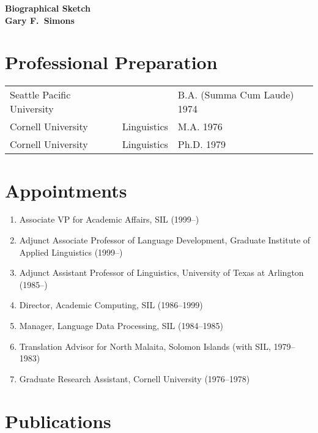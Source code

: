 \documentclass[11pt]{article}
\begin{document}
\begin{center}
{\large\bf Biographical Sketch\\[15pt] Gary F.~Simons}
\end{center}

\section{Professional Preparation}

\begin{tabular}{lll}
Seattle Pacific University & & B.A. (Summa Cum Laude) 1974 \\
Cornell University & Linguistics & M.A. 1976 \\
Cornell University & Linguistics & Ph.D. 1979 \\
\end{tabular}

\section{Appointments}

\begin{enumerate}
\item Associate VP for Academic Affairs, SIL (1999--)

\item Adjunct Associate Professor of Language Development,
  Graduate Institute of Applied Linguistics (1999--)

\item Adjunct Assistant Professor of Linguistics,
  University of Texas at Arlington (1985--)

\item Director, Academic Computing, SIL (1986--1999)

\item Manager, Language Data Processing, SIL (1984--1985)

\item Translation Advisor for North Malaita, Solomon Islands (with SIL, 1979--1983)

\item Graduate Research Assistant, Cornell University (1976--1978)

\end{enumerate}

\section{Publications}
\end{document}
